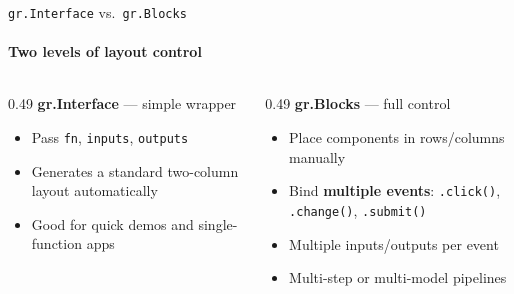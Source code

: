 \documentclass[aspectratio=169]{beamer}
\begin{document}
\begin{frame}[t]{\texttt{gr.Interface} vs.~\texttt{gr.Blocks}}
\framesubtitle{Two levels of layout control}
\begin{columns}[T,onlytextwidth]
    \begin{column}{0.49\textwidth}
        \textbf{gr.Interface} — simple wrapper
        \begin{itemize}
            \item Pass \texttt{fn}, \texttt{inputs}, \texttt{outputs}
            \item Generates a standard two-column layout automatically
            \item Good for quick demos and single-function apps
        \end{itemize}

    \end{column}
    \begin{column}{0.49\textwidth}
\textbf{gr.Blocks} — full control
        \begin{itemize}
            \item Place components in rows/columns manually
            \item Bind \textbf{multiple events}: \texttt{.click()}, \texttt{.change()}, \texttt{.submit()}
            \item Multiple inputs/outputs per event
            \item Multi-step or multi-model pipelines
        \end{itemize}
    \end{column}
\end{columns}
\end{frame}
\end{document}
